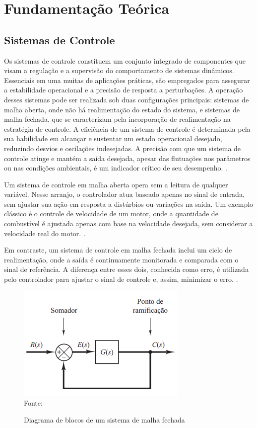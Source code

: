 \chapter{Fundamentação Teórica}


\section{Sistemas de Controle}

Os sistemas de controle constituem um conjunto integrado de componentes que visam a regulação e a supervisão do
comportamento de sistemas dinâmicos.
Essenciais em uma muitas de aplicações práticas, são empregados para assegurar a estabilidade operacional e a precisão
de resposta a perturbações.
A operação desses sistemas pode ser realizada sob duas configurações principais: sistemas de malha aberta,
onde não há realimentação do estado do sistema, e sistemas de malha fechada, que se caracterizam pela incorporação de
realimentação na estratégia de controle.
A eficiência de um sistema de controle é determinada pela sua habilidade em alcançar e sustentar um estado operacional
desejado, reduzindo desvios e oscilações indesejadas.
A precisão com que um sistema de controle atinge e mantém a saída desejada, apesar das flutuações nos parâmetros ou nas
condições ambientais, é um indicador crítico de seu desempenho. \cite{ogata2010engenharia}.

Um sistema de controle em malha aberta opera sem a leitura de qualquer variável.
Nesse arranjo, o controlador atua baseado apenas no sinal de entrada, sem ajustar sua ação em resposta a distúrbios ou
variações na saída.
Um exemplo clássico é o controle de velocidade de um motor, onde a quantidade de combustível é ajustada apenas com base
na velocidade desejada, sem considerar a velocidade real do motor. \cite{ogata2010engenharia}.

Em contraste, um sistema de controle em malha fechada inclui um ciclo de realimentação, onde a saída é continuamente
monitorada e comparada com o sinal de referência.
A diferença entre esses dois, conhecida como erro, é utilizada pelo controlador para ajustar o sinal de controle e,
assim, minimizar o erro. \cite{ogata2010engenharia}.

\begin{figure}[H]
    \centering
    \caption{Diagrama de blocos de um sistema de malha fechada}
    \includegraphics[scale=1]{figuras/closed_loop}
    \label{fig:closed_loop}
    \\
    \vspace{0cm}\hspace{0cm}\small{Fonte: \cite[Fig 2.3]{ogata2010engenharia}}
\end{figure}


